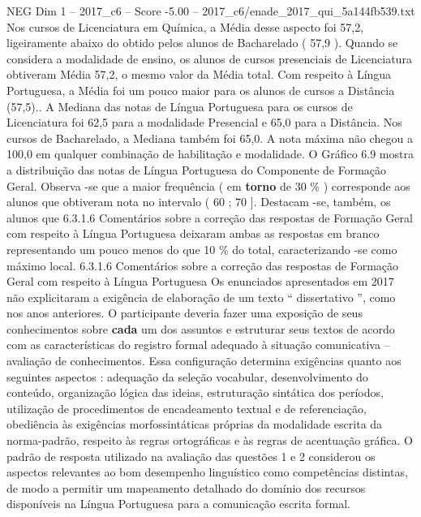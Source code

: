 \begin{textsample}{NEG Dim 1 – 2017\_c6 – Score -5.00 – 2017\_c6/enade\_2017\_qui\_5a144fb539.txt}
Nos cursos de Licenciatura em Química, a Média desse aspecto foi 57,2, ligeiramente abaixo do obtido pelos alunos de Bacharelado ( 57,9 ).
Quando se considera a modalidade de ensino, os alunos de cursos presenciais de Licenciatura obtiveram Média 57,2, o mesmo valor da Média total.
Com respeito à Língua Portuguesa, a Média foi um pouco maior para os alunos de cursos a Distância (57,5)..
A Mediana das notas de Língua Portuguesa para os cursos de Licenciatura foi 62,5 para a modalidade Presencial e 65,0 para a Distância.
Nos cursos de Bacharelado, a Mediana também foi 65,0.
A nota máxima não chegou a 100,0 em qualquer combinação de habilitação e modalidade.
O Gráfico 6.9 mostra a distribuição das notas de Língua Portuguesa do Componente de Formação Geral.
Observa -se que a maior frequência ( em \textbf{torno} de 30 \% ) corresponde aos alunos que obtiveram nota no intervalo ( 60 ; 70 ].
Destacam -se, também, os alunos que 6.3.1.6 Comentários sobre a correção das respostas de Formação Geral com respeito à Língua Portuguesa deixaram ambas as respostas em branco representando um pouco menos do que 10 \% do total, caracterizando -se como máximo local. 6.3.1.6 Comentários sobre a correção das respostas de Formação Geral com respeito à Língua Portuguesa Os enunciados apresentados em 2017 não explicitaram a exigência de elaboração de um texto “ dissertativo ”, como nos anos anteriores.
O participante deveria fazer uma exposição de seus conhecimentos sobre \textbf{cada} um dos assuntos e estruturar seus textos de acordo com as características do registro formal adequado à situação comunicativa – avaliação de conhecimentos.
Essa configuração determina exigências quanto aos seguintes aspectos : adequação da seleção vocabular, desenvolvimento do conteúdo, organização lógica das ideias, estruturação sintática dos períodos, utilização de procedimentos de encadeamento textual e de referenciação, obediência às exigências morfossintáticas próprias da modalidade escrita da norma-padrão, respeito às regras ortográficas e às regras de acentuação gráfica.
O padrão de resposta utilizado na avaliação das questões 1 e 2 considerou os aspectos relevantes ao bom desempenho linguístico como competências distintas, de modo a permitir um mapeamento detalhado do domínio dos recursos disponíveis na Língua Portuguesa para a comunicação escrita formal.

\end{textsample}
